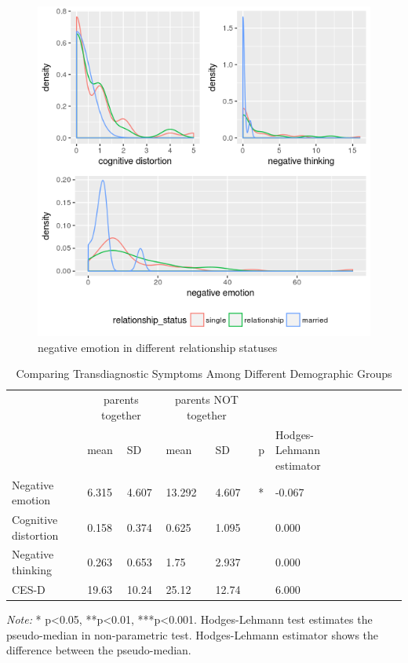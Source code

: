 \begin{figure}
  \includegraphics[scale=0.9]{neg_emo_rela}
  \caption{negative emotion in different relationship statuses}
  \label{fig:three}
\end{figure}


\begin{table}%
\caption{Comparing Transdiagnostic Symptoms Among Different Demographic Groups}
\label{tab:three}
\begin{minipage}{\columnwidth}
\begin{center}
\begin{tabular}{lllllllllll}
  \toprule
        & \multicolumn{2}{c}{parents together}	& \multicolumn{2}{c}{parents NOT together}     \\ 
      & mean &  SD & mean &  SD & p & Hodges-Lehmann estimator \\   
    \hline
    \hline
 Negative emotion  &6.315  & 4.607 & 13.292 &4.607 &* & -0.067 \\
  Cognitive distortion   &0.158  & 0.374 &0.625 &1.095 & &0.000 \\
  Negative thinking  &0.263  & 0.653 & 1.75 &2.937 & &0.000\\
  CES-D  &19.63  & 10.24 & 25.12 &12.74 & & 6.000\\
  \bottomrule
\end{tabular}
\end{center}
\bigskip\centering

 \emph{Note:} * p<0.05, **p<0.01, ***p<0.001. Hodges-Lehmann test estimates the pseudo-median in non-parametric test. Hodges-Lehmann estimator shows the difference between the pseudo-median.

\end{minipage}
\end{table}%


